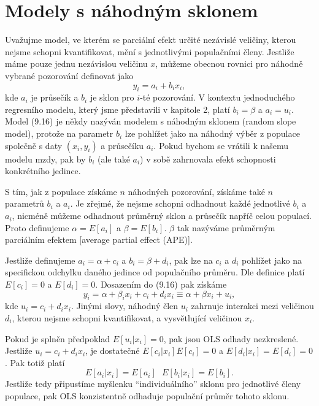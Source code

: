 \section{Modely s náhodným sklonem}

Uvažujme model, ve kterém se parciální efekt určité nezávislé veličiny, kterou nejsme schopni kvantifikovat, mění s jednotlivými populačními členy. Jestliže máme pouze jednu nezávislou veličinu $x$, můžeme obecnou rovnici pro náhodně vybrané pozorování definovat jako
\begin{equation}
y_i = a_i + b_i x_i,
\end{equation}
kde $a_i$ je průsečík a $b_i$ je sklon pro $i$-té pozorování. V kontextu jednoduchého regresního modelu, který jsme představili v kapitole 2, platí $b_i = \beta$ a $a_i = u_i$. Model (9.16) je někdy nazýván modelem s náhodným sklonem (random slope model), protože na parametr $b_i$ lze pohlížet jako na náhodný výběr z populace společně s daty $(x_i, y_i)$ a průsečíku $a_i$. Pokud bychom se vrátili k našemu modelu mzdy, pak by $b_i$ (ale také $a_i$) v sobě zahrnovala efekt schopnosti konkrétního jedince.

S tím, jak z populace získáme $n$ náhodných pozorování, získáme také $n$ parametrů $b_i$ a $a_i$. Je zřejmé, že nejsme schopni odhadnout každé jednotlivé $b_i$ a $a_i$, nicméně můžeme odhadnout průměrný sklon a průsečík napříč celou populací. Proto definujeme $\alpha = E[a_i]$ a $\beta = E[b_i]$. $\beta$ tak nazýváme průměrným parciálním efektem [average partial effect (APE)].

Jestliže definujeme $a_i = \alpha + c_i$ a $b_i = \beta + d_i$, pak lze na $c_i$ a $d_i$ pohlížet jako na specifickou odchylku daného jedince od populačního průměru. Dle definice platí $E[c_i] = 0$ a $E[d_i] = 0$. Dosazením do (9.16) pak získáme
\begin{equation}
y_i = \alpha + \beta_i x_i + c_i + d_i x_i \equiv \alpha + \beta x_i + u_i,
\end{equation}
kde $u_i = c_i + d_i x_i$. Jinými slovy, náhodný člen $u_i$ zahrnuje interakci mezi veličinou $d_i$, kterou nejsme schopni kvantifikovat, a vysvětlující veličinou $x_i$.

Pokud je splněn předpoklad $E[u_i | x_i] = 0$, pak jsou OLS odhady nezkreslené. Jestliže $u_i = c_i + d_i x_i$, je dostatečné $E[c_i|x_i] E[c_i] = 0$ a $E[d_i|x_i] = E[d_i] = 0$. Pak totiž platí
\begin{equation}
E[a_i|x_i] = E[a_i] ~~~ E[b_i|x_i] = E[b_i].
\end{equation}
Jestliže tedy připustíme myšlenku ``individuálního'' sklonu pro jednotlivé členy populace, pak OLS konzistentně odhaduje populační průměr tohoto sklonu.

